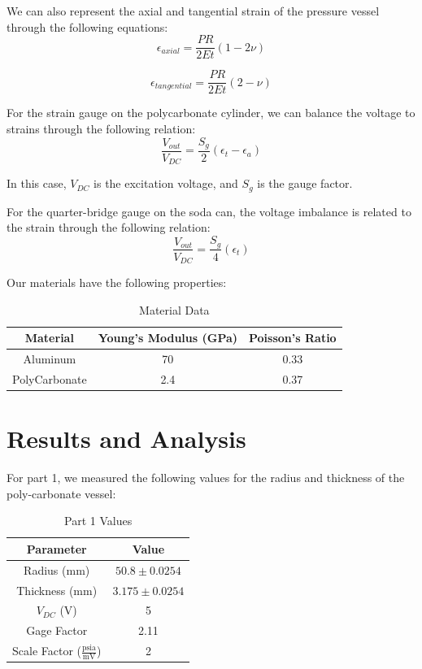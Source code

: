 \documentclass{article}
\begin{document}
We can also represent the axial and tangential strain of the pressure vessel through the following equations:
\[
\epsilon_{axial} = \frac{PR}{2E t}(1 - 2\nu)
\]

\[
\epsilon_{tangential} = \frac{PR}{2E t}(2 - \nu)
\]

For the strain gauge on the polycarbonate cylinder, we can balance the voltage to strains through the following relation:
\[
  \frac{V_{out}}{V_{DC}} = \frac{S_g}{2}(\epsilon_t - \epsilon_a)
\]

In this case, $V_{DC}$ is the excitation voltage, and $S_g$ is the gauge factor.

For the quarter-bridge gauge on the soda can, the voltage imbalance is related to the strain through the following relation:
\[
  \frac{V_{out}}{V_{DC}} = \frac{S_g}{4}(\epsilon_t)
\]

Our materials have the following properties:
\begin{table}[H]
  \centering
  \caption{Material Data}
  \label{tab:material-data}
  \begin{tabular}{|c|c|c|}
  \hline
  Material       & Young's Modulus (GPa) & Poisson's Ratio \\
  \hline
  Aluminum       & 70                     & 0.33            \\
  PolyCarbonate  & 2.4                    & 0.37            \\
  \hline
  \end{tabular}
\end{table}
  


\section{Results and Analysis}

For part 1, we measured the following values for the radius and thickness of the poly-carbonate vessel:

\begin{table}[H]
  \centering
  \caption{Part 1 Values}
  \label{tab:part1-values}
  \begin{tabular}{|c|c|}
  \hline
  Parameter               & Value           \\
  \hline
  Radius (mm)             & $50.8 \pm 0.0254$   \\
  Thickness (mm)          & $3.175 \pm 0.0254$  \\
  $V_{DC}$ (V)            & 5               \\
  Gage Factor             & 2.11            \\
  Scale Factor ($\frac{\text{psia}}{\text{mV}}$)   & 2  \\
  \hline
  \end{tabular}
\end{table}
\end{document}
